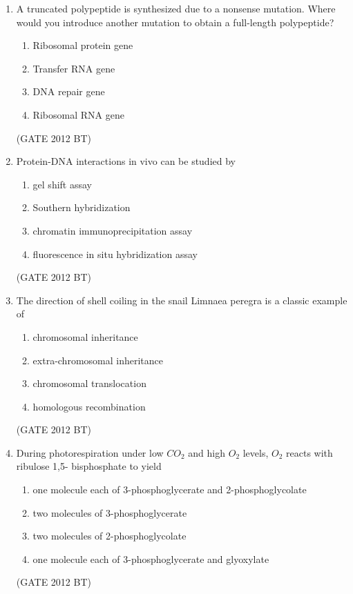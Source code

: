 \documentclass[journal,12pt,onecolumn]{IEEEtran}
\theoremstyle{remark}
\begin{document}
\begin{enumerate}
\item A truncated polypeptide is synthesized due to a nonsense mutation. Where would you introduce another mutation to obtain a full-length polypeptide?
\begin{multicols}{2}
\begin{enumerate}
\item 	Ribosomal protein gene
\item  Transfer RNA gene
\item  DNA repair gene	
\item  Ribosomal RNA gene
\end{enumerate}
\end{multicols} \hfill(GATE 2012 BT)

\item Protein-DNA interactions in vivo can be studied by
\begin{multicols}{2}
\begin{enumerate}
\item 	gel shift assay 
\item  Southern hybridization
\item  chromatin immunoprecipitation assay	
\item  fluorescence in situ hybridization assay
\end{enumerate}
\end{multicols} \hfill(GATE 2012 BT)

\item The direction of shell coiling in the snail Limnaea peregra is a classic example of
\begin{multicols}{2}
\begin{enumerate}
\item	chromosomal inheritance	
\item  extra-chromosomal inheritance
\item  chromosomal translocation	
\item  homologous recombination
\end{enumerate}
\end{multicols} \hfill(GATE 2012 BT)


\item During photorespiration under low $CO_{2}$ and high $O_2$ levels, $O_2$ reacts with ribulose 1,5- bisphosphate to yield
\begin{enumerate}
\item	one molecule each of 3-phosphoglycerate and 2-phosphoglycolate
\item 	two molecules of 3-phosphoglycerate
\item 	two molecules of 2-phosphoglycolate
\item 	one molecule each of 3-phosphoglycerate and glyoxylate
\end{enumerate} \hfill(GATE 2012 BT)


\end{enumerate}
\end{document}
